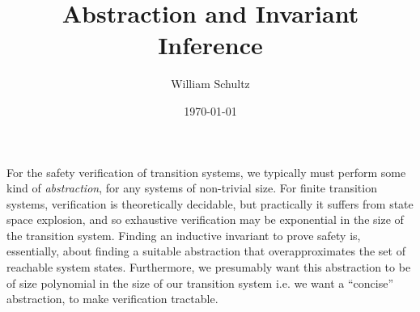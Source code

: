 \documentclass[10pt]{article}
\begin{document}
\title{Abstraction and Invariant Inference}
\author{William Schultz}
\date{\today}

\maketitle










For the safety verification of transition systems, we typically must perform some kind of \textit{abstraction}, for any systems of non-trivial size. For finite transition systems, verification is theoretically decidable, but practically it suffers from state space explosion, and so exhaustive verification may be exponential in the size of the transition system. Finding an inductive invariant to prove safety is, essentially, about finding a suitable abstraction that overapproximates the set of reachable system states. Furthermore, we presumably want this abstraction to be of size polynomial in the size of our transition system i.e. we want a ``concise'' abstraction, to make verification tractable.
\end{document}
